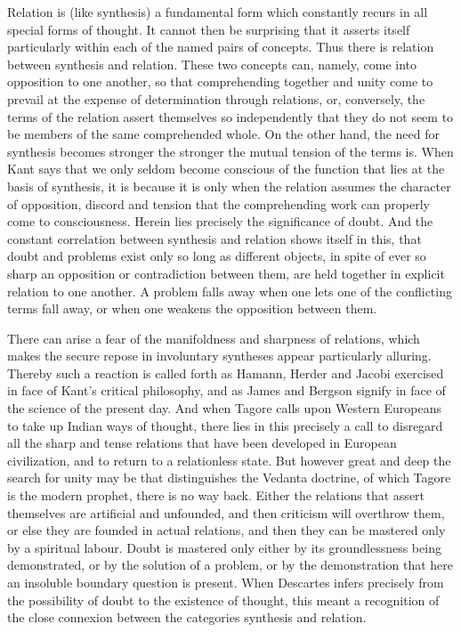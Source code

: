 \documentclass[12pt]{article}
\newcommand{\opage}[1]{\marginnote{\footnotesize\textit{[#1]}}}
\begin{document}
Relation is (like synthesis) a fundamental form which constantly recurs in
all special forms of thought. It cannot then be surprising that it asserts
itself particularly within each of the named pairs of concepts. Thus there
is relation between synthesis and relation. These two concepts can, namely,
come into opposition to one another, so that comprehending together and
unity come to prevail at the expense of determination through relations, or,
conversely, the terms of the relation assert themselves so independently
that they do not seem to be members of the same comprehended whole. On the
other hand, the need for synthesis becomes stronger the stronger the mutual
tension of the terms is. When Kant says that we only seldom become conscious
of the function that lies at the basis of synthesis, it is because it is
only when the relation assumes the character of opposition, discord and
tension that the comprehending work can properly come to \opage{28}consciousness.
Herein lies precisely the significance of doubt. And the constant
correlation between synthesis and relation shows itself in this, that doubt
and problems exist only so long as different objects, in spite of ever so
sharp an opposition or contradiction between them, are held together in
explicit relation to one another. A problem falls away when one lets one of
the conflicting terms fall away, or when one weakens the opposition between
them.

There can arise a fear of the manifoldness and sharpness of relations, which
makes the secure repose in involuntary syntheses appear particularly
alluring. Thereby such a reaction is called forth as Hamann, Herder and
Jacobi exercised in face of Kant's critical philosophy, and as James and
Bergson signify in face of the science of the present day. And when Tagore
calls upon Western Europeans to take up Indian ways of thought, there lies
in this precisely a call to disregard all the sharp and tense relations that
have been developed in European civilization, and to return to a relationless
state. But however great and deep the search for unity may be that
distinguishes the Vedanta doctrine, of which Tagore is the modern prophet,
there is no way back. Either the relations that assert themselves are
artificial and unfounded, and then criticism will overthrow them, or else
they are founded in actual relations, and then they can be mastered only by
a spiritual labour. Doubt is mastered only either by its groundlessness
being demonstrated, or by the solution of a problem, or by the demonstration
that here an insoluble boundary question is present. When Descartes infers
precisely from the possibility of doubt to the existence of thought, this
meant a recognition of the close connexion between the categories synthesis
and relation.
\end{document}
